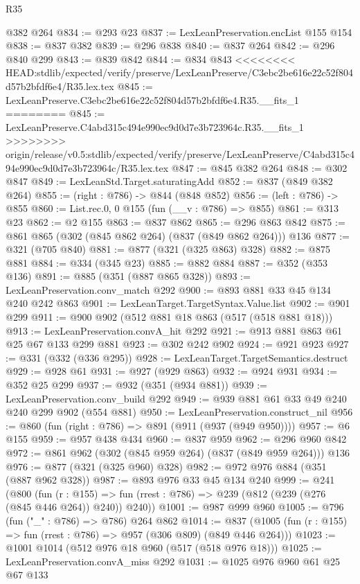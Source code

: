 \begin{lexlean}{R35}
\begin{coremodule}
{{{{{{{{{{{{    @382
    @264
@834 := @293 @23
@837 := LexLeanPreservation.encList @155 @154
@838 := @837 @382
@839 := @296 @838
@840 := @837 @264
@842 := @296 @840 @299
@843 := @839 @842
@844 := @834 @843
<<<<<<<< HEAD:stdlib/expected/verify/preserve/LexLeanPreserve/C3ebc2be616e22c52f804d57b2bfdf6e4/R35.lex.tex
@845 := LexLeanPreserve.C3ebc2be616e22c52f804d57b2bfdf6e4.R35.__fits_1
========
@845 := LexLeanPreserve.C4abd315c494e990ec9d0d7e3b723964c.R35.__fits_1
>>>>>>>> origin/release/v0.5:stdlib/expected/verify/preserve/LexLeanPreserve/C4abd315c494e990ec9d0d7e3b723964c/R35.lex.tex
@847 := @845 @382 @264
@848 := @302 @847
@849 := LexLeanStd.Target.saturatingAdd
@852 := @837 (@849 @382 @264)
@855 := (right : @786) -> @844 (@848 @852)
@856 := (left : @786) -> @855
@860 := List.rec.{0, 0} @155 (fun (__v : @786) => @855)
@861 := @313 @23
@862 := @2 @155
@863 := @837 @862
@865 := @296 @863 @842
@875 := @861 @865 (@302 (@845 @862 @264) (@837 (@849 @862 @264))) @136
@877 := @321 (@705 @840)
@881 := @877 (@321 (@325 @863) @328)
@882 := @875 @881
@884 := @334 (@345 @23)
@885 := @882 @884
@887 := @352 (@353 @136)
@891 := @885 (@351 (@887 @865 @328))
@893 := LexLeanPreservation.conv_match @292
@900 := @893 @881 @33 @45 @134 @240 @242 @863
@901 := LexLeanTarget.TargetSyntax.Value.list
@902 := @901 @299
@911 := @900 @902 (@512 @881 @18 @863 (@517 (@518 @881 @18)))
@913 := LexLeanPreservation.convA_hit @292
@921 := @913 @881 @863 @61 @25 @67 @133 @299 @881
@923 := @302 @242 @902
@924 := @921 @923
@927 := @331 (@332 (@336 @295))
@928 := LexLeanTarget.TargetSemantics.destruct
@929 := @928 @61
@931 := @927 (@929 @863)
@932 := @924 @931
@934 := @352 @25 @299
@937 := @932 (@351 (@934 @881))
@939 := LexLeanPreservation.conv_build @292
@949 := @939 @881 @61 @33 @49 @240 @240 @299 @902 (@554 @881)
@950 := LexLeanPreservation.construct_nil
@956 := @860 (fun (right : @786) => @891 (@911 (@937 (@949 @950))))
@957 := @6 @155
@959 := @957 @438 @434
@960 := @837 @959
@962 := @296 @960 @842
@972 := @861 @962 (@302 (@845 @959 @264) (@837 (@849 @959 @264))) @136
@976 := @877 (@321 (@325 @960) @328)
@982 := @972 @976 @884 (@351 (@887 @962 @328))
@987 := @893 @976 @33 @45 @134 @240
@999 := @241
    (@800
      (fun (r : @155) =>
      fun (rrest : @786) => @239 (@812 (@239 (@276 (@845 @446 @264)) @240)) @240))
@1001 := @987 @999 @960
@1005 := @796 (fun ("_" : @786) => @786) @264 @862
@1014 := @837 (@1005 (fun (r : @155) => fun (rrest : @786) => @957 (@306 @809) (@849 @446 @264)))
@1023 := @1001 @1014 (@512 @976 @18 @960 (@517 (@518 @976 @18)))
@1025 := LexLeanPreservation.convA_miss @292
@1031 := @1025 @976 @960 @61 @25 @67 @133
}}}}}}}}}}}}
\end{coremodule}
\end{lexlean}
